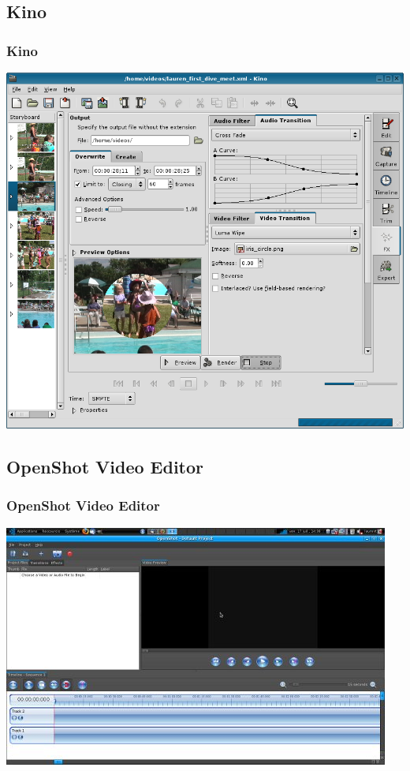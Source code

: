 \subsection{Kino}
\begin{frame}
 \frametitle{Kino}
   \includegraphics[scale=0.25]{ressources/kino-fx.png}

\end{frame}

\subsection{OpenShot Video Editor}
\begin{frame}
 \frametitle{OpenShot Video Editor}
  \includegraphics[scale=0.60]{ressources/openshotvideo.jpg}

\end{frame}

